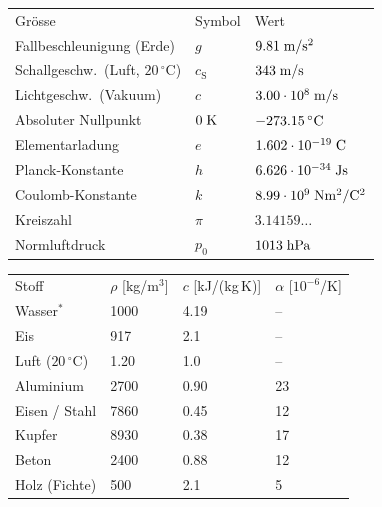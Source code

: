 \begin{minipage}[t]{0.46\linewidth}\vspace{0pt}
{\footnotesize\setlength{\tabcolsep}{4pt}\renewcommand{\arraystretch}{1.15}
\begin{tabular}[t]{@{}l l l@{}}
\rowcolor{bernl} Grösse & Symbol & Wert\\
Fallbeschleunigung (Erde) & \(g\) & \(9.81\;\mathrm{m/s^2}\)\\
Schallgeschw.\ (Luft, \(20\,^\circ\)C) & \(c_{\mathrm{S}}\) & \(343\;\mathrm{m/s}\)\\
Lichtgeschw.\ (Vakuum) & \(c\) & \(3.00\cdot10^{8}\;\mathrm{m/s}\)\\
Absoluter Nullpunkt & \(0\;\mathrm{K}\) & \(-273.15\,^\circ\mathrm{C}\)\\
Elementarladung & \(e\) & \(1.602\cdot10^{-19}\;\mathrm{C}\)\\
Planck-Konstante & \(h\) & \(6.626\cdot10^{-34}\;\mathrm{Js}\)\\
Coulomb-Konstante & \(k\) & \(8.99\cdot10^{9}\;\mathrm{Nm^2/C^2}\)\\
Kreiszahl & \(\pi\) & \(3.14159\ldots\)\\
Normluftdruck & \(p_0\) & \(1013\;\mathrm{hPa}\)\\
\end{tabular}}

\vspace{1.2mm}
{\footnotesize\setlength{\tabcolsep}{4pt}\renewcommand{\arraystretch}{1.15}
\begin{tabular}[t]{@{}l l l l@{}}
\rowcolor{bernl} Stoff & \(\rho\) [kg/m\(^3\)] & \(c\) [kJ/(kg\,K)] & \(\alpha\) [\(10^{-6}\)/K]\\
Wasser\(^{\ast}\) & 1000 & 4.19 & --\\
Eis & 917 & 2.1 & --\\
Luft (\(20\,^\circ\)C) & 1.20 & 1.0 & --\\
Aluminium & 2700 & 0.90 & 23\\
Eisen / Stahl & 7860 & 0.45 & 12\\
Kupfer & 8930 & 0.38 & 17\\
Beton & 2400 & 0.88 & 12\\
Holz (Fichte) & 500 & 2.1 & 5\\
\end{tabular}}
\end{minipage}\hfill
